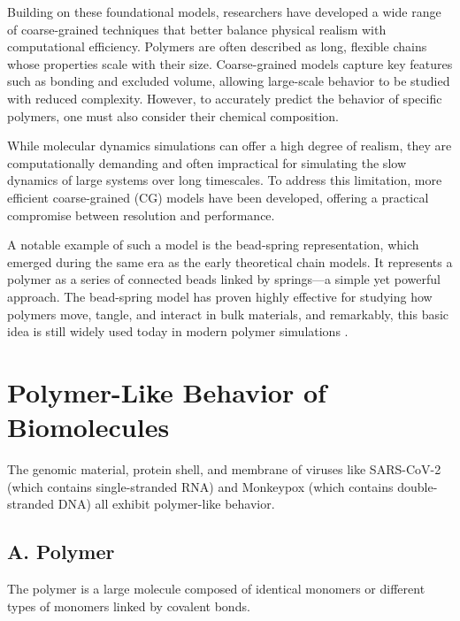 \documentclass[12pt]{article}
\begin{document}
\begin{flushleft}
Building on these foundational models, researchers have developed a wide range of coarse-grained techniques that better balance physical realism with computational efficiency. Polymers are often described as long, flexible chains whose properties scale with their size. Coarse-grained models capture key features such as bonding and excluded volume, allowing large-scale behavior to be studied with reduced complexity. However, to accurately predict the behavior of specific polymers, one must also consider their chemical composition.

While molecular dynamics simulations can offer a high degree of realism, they are computationally demanding and often impractical for simulating the slow dynamics of large systems over long timescales. To address this limitation, more efficient coarse-grained (CG) models have been developed, offering a practical compromise between resolution and performance.

A notable example of such a model is the bead-spring representation, which emerged during the same era as the early theoretical chain models. It represents a polymer as a series of connected beads linked by springs—a simple yet powerful approach. The bead-spring model has proven highly effective for studying how polymers move, tangle, and interact in bulk materials, and remarkably, this basic idea is still widely used today in modern polymer simulations \cite{Kremer1990}.
	






	
	
	
	
\vspace{-1em} 
\section*{Polymer-Like Behavior of Biomolecules} 
 The genomic material, protein shell, and membrane of viruses like SARS-CoV-2 (which contains single-stranded RNA) and Monkeypox (which contains double-stranded DNA) all exhibit polymer-like behavior.


\vspace{-1em}
\subsection*{A. Polymer}
The polymer is a large molecule composed of identical monomers or different types of monomers linked by covalent bonds\cite {Everaers2020}. 


\end{flushleft}
\end{document}
